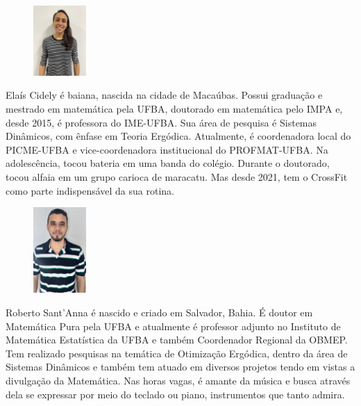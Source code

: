 \documentclass{hipatia}
\begin{document}
\vspace{0.5cm}
\begin{figure}
	\vspace{-10pt}
	\includegraphics[width=2cm]{Elais.jpg}
\end{figure}\noindent 
Elaís Cidely é baiana, nascida na cidade de Macaúbas. Possui graduação e mestrado em matemática pela UFBA, doutorado em matemática pelo IMPA e, desde 2015, é professora do IME-UFBA. Sua área de pesquisa é Sistemas Dinâmicos, com ênfase em Teoria Ergódica. Atualmente, é coordenadora local do PICME-UFBA e vice-coordenadora institucional do PROFMAT-UFBA. Na adolescência,  tocou bateria em uma banda do colégio. Durante o doutorado, tocou alfaia em um grupo carioca de maracatu. Mas desde 2021, tem o CrossFit como parte indispensável da sua rotina.

\vspace{0.5cm}
\begin{figure}
	\vspace{-10pt}
	\includegraphics[width=2cm]{Roberto.JPG}
\end{figure}\noindent
  Roberto Sant'Anna é nascido e criado em Salvador, Bahia. É doutor em 
  Matemática Pura pela UFBA e atualmente é professor adjunto no Instituto 
  de Matemática Estatística da UFBA e também Coordenador Regional da OBMEP. 
  Tem realizado pesquisas na temática de Otimização Ergódica, dentro da área 
  de Sistemas Dinâmicos e também tem atuado em diversos projetos tendo em 
  vistas a divulgação da Matemática. Nas horas vagas, é amante da música e 
  busca através dela se expressar por meio do teclado ou piano, 
  instrumentos que tanto admira.









%
\end{document}
